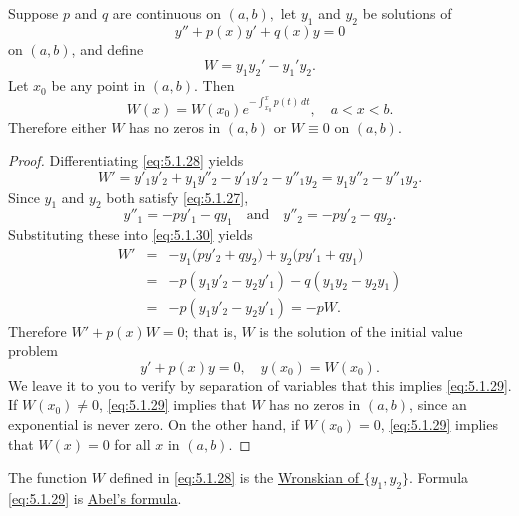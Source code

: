 \documentclass{ximera}
\begin{document}
\begin{theorem}\label{thmtype:5.1.4}
Suppose $p$ and $q$ are continuous on $(a,b),$ let $y_1$ and
$y_2$ be solutions of
\begin{equation}\label{eq:5.1.27}
y''+p(x)y'+q(x)y=0
\end{equation}
on $(a,b)$, and define
\begin{equation}\label{eq:5.1.28}
W=y_1y_2'-y_1'y_2.
\end{equation}
Let  $x_0$ be any point in $(a,b).$ Then
\begin{equation} \label{eq:5.1.29}
W(x)=W(x_0) e^{-\int^x_{x_0}p(t)\,
dt}, \quad a<x<b.
\end{equation}
Therefore  either $W$ has no zeros in  $(a,b)$ or $W\equiv0$
on  $(a,b).$
\end{theorem}



\begin{proof}
Differentiating \eqref{eq:5.1.28} yields
\begin{equation}\label{eq:5.1.30}
W'=y'_1y'_2+y_1y''_2-y'_1y'_2-y''_1y_2=
y_1y''_2-y''_1y_2.
\end{equation}
 Since $y_1$ and $y_2$ both satisfy \eqref{eq:5.1.27},
$$
y''_1 =-py'_1-qy_1\quad\mbox{and}\quad
y''_2 =-py'_2-qy_2.
$$
Substituting these into \eqref{eq:5.1.30} yields
\begin{eqnarray*}
W'&=& -y_1\bigl(py'_2+qy_2\bigr)
+y_2\bigl(py'_1+qy_1\bigr) \\
&=&  -p(y_1y'_2-y_2y'_1)-q(y_1y_2-y_2y_1)\\
&=& -p(y_1y'_2-y_2y'_1)=-pW.
\end{eqnarray*}
Therefore $W'+p(x)W=0$;
that is, $W$ is the solution of the initial value problem
$$
y'+p(x)y=0,\quad y(x_0)=W(x_0).
$$
We leave it to you to verify by separation of variables that this
implies \eqref{eq:5.1.29}. If $W(x_0)\ne0$, \eqref{eq:5.1.29} implies
that
$W$ has no zeros in $(a,b)$, since an exponential is never zero. On
the other hand, if $W(x_0)=0$,  \eqref{eq:5.1.29} implies that $W(x)=0$
for all $x$ in $(a,b)$. 
\end{proof}

The function $W$ defined in \eqref{eq:5.1.28} is  the
\href{http://www-history.mcs.st-and.ac.uk/Mathematicians/Wronski.html}
{Wronskian of $\{y_1,y_2\}$}.
 Formula \eqref{eq:5.1.29} is
 \href{http://www-history.mcs.st-and.ac.uk/Mathematicians/Abel.html}
{Abel's formula}.
\end{document}
